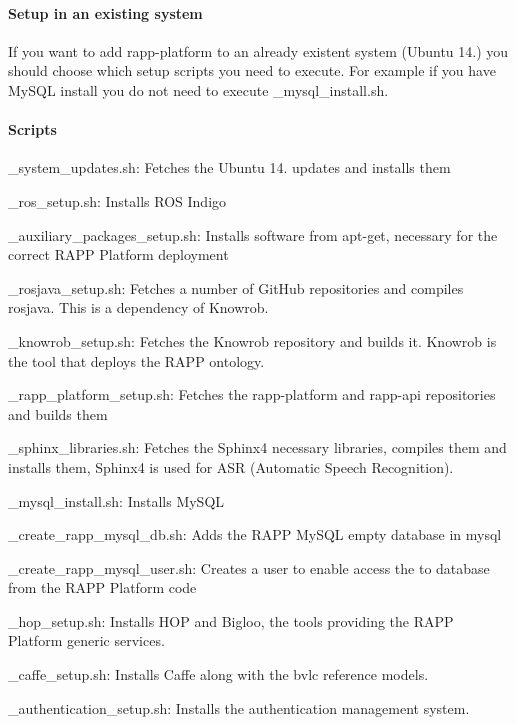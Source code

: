 \paragraph*{Setup in an existing system}

If you want to add rapp-\/platform to an already existent system (Ubuntu 14.) you should choose which setup scripts you need to execute. For example if you have My\-S\-Q\-L install you do not need to execute {\-\_\-mysql\-\_\-install.\-sh}.

\paragraph*{Scripts}


\begin{DoxyItemize}
\item {\-\_\-system\-\_\-updates.\-sh}\-: Fetches the Ubuntu 14. updates and installs them
\item {\-\_\-ros\-\_\-setup.\-sh}\-: Installs R\-O\-S Indigo
\item {\-\_\-auxiliary\-\_\-packages\-\_\-setup.\-sh}\-: Installs software from apt-\/get, necessary for the correct R\-A\-P\-P Platform deployment
\item {\-\_\-rosjava\-\_\-setup.\-sh}\-: Fetches a number of Git\-Hub repositories and compiles rosjava. This is a dependency of Knowrob.
\item {\-\_\-knowrob\-\_\-setup.\-sh}\-: Fetches the Knowrob repository and builds it. Knowrob is the tool that deploys the R\-A\-P\-P ontology.
\item {\-\_\-rapp\-\_\-platform\-\_\-setup.\-sh}\-: Fetches the rapp-\/platform and rapp-\/api repositories and builds them
\item {\-\_\-sphinx\-\_\-libraries.\-sh}\-: Fetches the Sphinx4 necessary libraries, compiles them and installs them, Sphinx4 is used for A\-S\-R (Automatic Speech Recognition).
\item {\-\_\-mysql\-\_\-install.\-sh}\-: Installs My\-S\-Q\-L
\item {\-\_\-create\-\_\-rapp\-\_\-mysql\-\_\-db.\-sh}\-: Adds the R\-A\-P\-P My\-S\-Q\-L empty database in mysql
\item {\-\_\-create\-\_\-rapp\-\_\-mysql\-\_\-user.\-sh}\-: Creates a user to enable access the to database from the R\-A\-P\-P Platform code
\item {\-\_\-hop\-\_\-setup.\-sh}\-: Installs H\-O\-P and Bigloo, the tools providing the R\-A\-P\-P Platform generic services.
\item {\-\_\-caffe\-\_\-setup.\-sh}\-: Installs Caffe along with the bvlc reference models.
\item {\-\_\-authentication\-\_\-setup.\-sh}\-: Installs the authentication management system. 
\end{DoxyItemize}